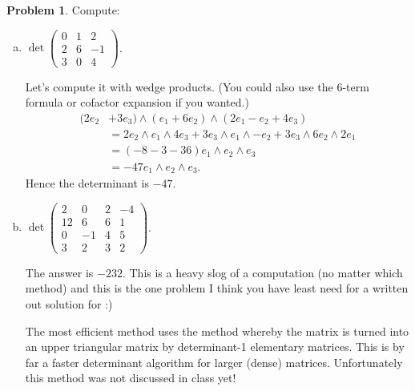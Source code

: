 \documentclass[11pt,oneside]{amsart}
\theoremstyle{definition}
\newtheorem{problem}{Problem}
\begin{document}
    \newpage

    \begin{problem}
        Compute:
        \begin{enumerate}[(a)]
            \item $\det\begin{pmatrix}
                0&1&2\\2&6&-1\\3&0&4
            \end{pmatrix}$.
            \begin{solution}
                Let's compute it with wedge products. (You could also use the 6-term formula or cofactor expansion if you wanted.)
                \[\begin{split}
                    (2e_2&+3e_3)\wedge(e_1+6e_2)\wedge(2e_1-e_2+4e_3) \\
                    &= 2e_2\wedge e_1\wedge 4e_3+3e_3\wedge e_1\wedge -e_2+3e_3\wedge 6e_2\wedge 2e_1\\
                    &= (-8-3-36)e_1\wedge e_2\wedge e_3\\
                    &=-47e_1\wedge e_2\wedge e_3.
                \end{split}\]
                Hence the determinant is $-47$.
            \end{solution}
            \item $\det\begin{pmatrix}
                2&0&2&-4\\12&6&6&1\\0&-1&4&5\\3&2&3&2
            \end{pmatrix}$.
            \begin{solution}
                The answer is $-232$. This is a heavy slog of a computation (no matter which method) and this is the one problem I think you have least need for a written out solution for :)

                The most efficient method uses the method whereby the matrix is turned into an upper triangular matrix by determinant-1 elementary matrices. This is by far a faster determinant algorithm for larger (dense) matrices. Unfortunately this method was not discussed in class yet!
            \end{solution}
        \end{enumerate}
    \end{problem}
\end{document}

